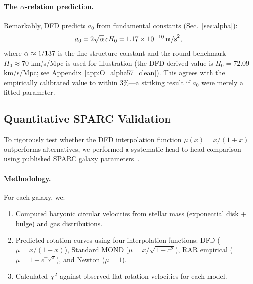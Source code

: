 \paragraph{The $\alpha$-relation prediction.}
Remarkably, DFD predicts $a_0$ from fundamental constants (Sec.~\ref{sec:alpha}):
\begin{equation}
a_0 = 2\sqrt{\alpha}\, c H_0 = 1.17 \times 10^{-10}\,\text{m/s}^2,
\end{equation}
where $\alpha \approx 1/137$ is the fine-structure constant and the round benchmark $H_0 \approx 70$ km/s/Mpc is used for illustration (the DFD-derived value is $H_0 = 72.09$ km/s/Mpc; see Appendix~\ref{app:O_alpha57_clean}). This agrees with the empirically calibrated value to within 3\%---a striking result if $a_0$ were merely a fitted parameter.

\begin{table}[t]
\centering
\caption{DFD galactic calibration parameters.}\label{tab:calibration}
\end{table}

\subsection{Quantitative SPARC Validation}\label{sec:galactic-sparc-validation}

To rigorously test whether the DFD interpolation function $\mu(x) = x/(1+x)$ outperforms alternatives, we performed a systematic head-to-head comparison using published SPARC galaxy parameters~\cite{Lelli2016,McGaugh2016RAR}.

\paragraph{Methodology.}
For each galaxy, we:
\begin{enumerate}
\item Computed baryonic circular velocities from stellar mass (exponential disk + bulge) and gas distributions.
\item Predicted rotation curves using four interpolation functions: DFD ($\mu = x/(1+x)$), Standard MOND ($\mu = x/\sqrt{1+x^2}$), RAR empirical ($\mu = 1-e^{-\sqrt{x}}$), and Newton ($\mu = 1$).
\item Calculated $\chi^2$ against observed flat rotation velocities for each model.
\end{enumerate}

